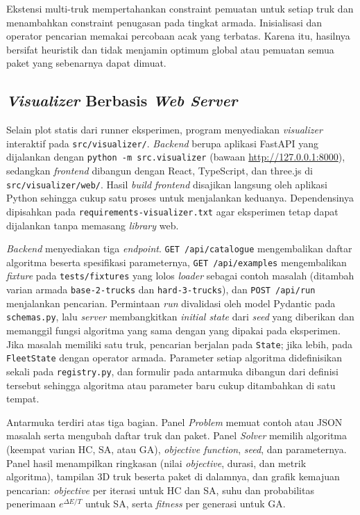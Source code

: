 Ekstensi multi-truk mempertahankan constraint pemuatan untuk setiap truk dan menambahkan constraint penugasan pada tingkat armada. Inisialisasi dan operator pencarian memakai percobaan acak yang terbatas. Karena itu, hasilnya bersifat heuristik dan tidak menjamin optimum global atau pemuatan semua paket yang sebenarnya dapat dimuat.

\subsection{\textit{Visualizer} Berbasis \textit{Web Server}}

Selain plot statis dari runner eksperimen, program menyediakan \textit{visualizer} interaktif pada \texttt{src/\allowbreak visualizer/}. \textit{Backend} berupa aplikasi FastAPI yang dijalankan dengan \texttt{python -m src.visualizer} (bawaan \url{http://127.0.0.1:8000}), sedangkan \textit{frontend} dibangun dengan React, TypeScript, dan three.js di \texttt{src/\allowbreak visualizer/\allowbreak web/}. Hasil \textit{build} \textit{frontend} disajikan langsung oleh aplikasi Python sehingga cukup satu proses untuk menjalankan keduanya. Dependensinya dipisahkan pada \texttt{requirements-visualizer.txt} agar eksperimen tetap dapat dijalankan tanpa memasang \textit{library} web.

\textit{Backend} menyediakan tiga \textit{endpoint}. \texttt{GET /api/catalogue} mengembalikan daftar algoritma beserta spesifikasi parameternya, \texttt{GET /api/examples} mengembalikan \textit{fixture} pada \texttt{tests/fixtures} yang lolos \textit{loader} sebagai contoh masalah (ditambah varian armada \texttt{base-2-trucks} dan \texttt{hard-3-trucks}), dan \texttt{POST /api/run} menjalankan pencarian. Permintaan \textit{run} divalidasi oleh model Pydantic pada \texttt{schemas.py}, lalu \textit{server} membangkitkan \textit{initial state} dari \textit{seed} yang diberikan dan memanggil fungsi algoritma yang sama dengan yang dipakai pada eksperimen. Jika masalah memiliki satu truk, pencarian berjalan pada \texttt{State}; jika lebih, pada \texttt{FleetState} dengan operator armada. Parameter setiap algoritma didefinisikan sekali pada \texttt{registry.py}, dan formulir pada antarmuka dibangun dari definisi tersebut sehingga algoritma atau parameter baru cukup ditambahkan di satu tempat.

Antarmuka terdiri atas tiga bagian. Panel \textit{Problem} memuat contoh atau JSON masalah serta mengubah daftar truk dan paket. Panel \textit{Solver} memilih algoritma (keempat varian HC, SA, atau GA), \textit{objective function}, \textit{seed}, dan parameternya. Panel hasil menampilkan ringkasan (nilai \textit{objective}, durasi, dan metrik algoritma), tampilan 3D truk beserta paket di dalamnya, dan grafik kemajuan pencarian: \textit{objective} per iterasi untuk HC dan SA, suhu dan probabilitas penerimaan $e^{\Delta E/T}$ untuk SA, serta \textit{fitness} per generasi untuk GA.


